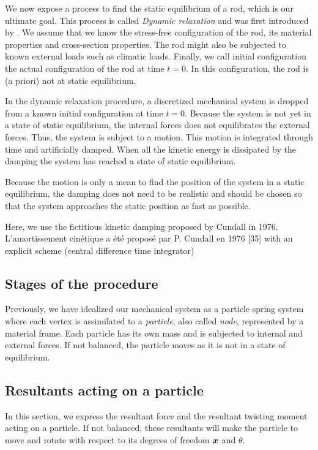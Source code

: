 We now expose a process to find the static equilibrium of a rod, which is our ultimate goal. This process is called \emph{Dynamic relaxation} and was first introduced by . We assume that we know the stress-free configuration of the rod, its material properties and cross-section properties. The rod might also be subjected to known external loads such as climatic loads. Finally, we call initial configuration the actual configuration of the rod at time $t=0$. In this configuration, the rod is (a priori) not at static equilibrium.

In the dynamic relaxation procedure, a discretized mechanical system is dropped from a known initial configuration at time $t=0$. Because the system is not yet in a state of static equilibrium, the internal forces does not equilibrates the external forces. Thus, the system is subject to a motion. This motion is integrated through time and artificially damped. When all the kinetic energy is dissipated by the damping the system has reached a state of static equilibrium.

Because the motion is only a mean to find the position of the system in a static equilibrium, the damping does not need to be realistic and should be chosen so that the system approaches the static position as fast as possible.

Here, we use the fictitious kinetic damping proposed by Cundall in 1976.
L’amortissement cinétique a été proposé par P. Cundall en 1976 [35]
with an explicit scheme (central difference time integrator)


\subsection{Stages of the procedure}
Previously, we have idealized our mechanical system as a  particle spring system where each vertex is assimilated to a \emph{particle}, also called \emph{node}, represented by a material frame. Each particle has its own mass and is subjected to internal and external forces. If not balanced, the particle moves as it is not in a state of equilibrium.

\subsection{Resultants acting on a particle}\label{sec:resFM}
In this section, we express the resultant force and the resultant twisting moment acting on a particle. If not balanced, these resultants will make the particle to move and rotate with respect to its degrees of freedom $\boldsymbol{x}$ and $\theta$.

